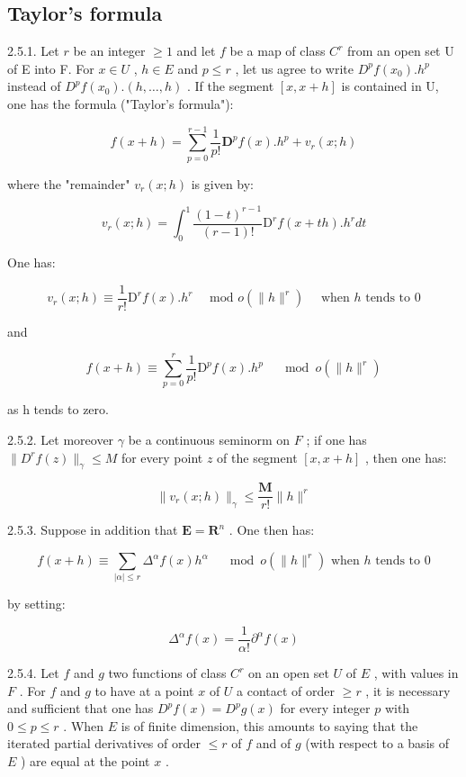 \subsection{Taylor's formula}

2.5.1. Let \(r\) be an integer \(\geqslant 1\) and let \(f\) be a map of class \(C^r\) from an open set U of E into F. For \(x \in U\) , \(h \in E\) and \(p \leqslant r\) , let us agree to write \(D^{p}f(x_0).h^p\) instead of \(D^{p}f(x_0).(h,\ldots,h)\) . If the segment \([x,x + h]\) is contained in U, one has the formula ("Taylor's formula"):

\[
f (x + h) = \sum_ {p = 0} ^ {r - 1} \frac {1}{p !} \mathbf {D} ^ {p} f (x). h ^ {p} + v _ {r} (x; h)
\]

where the "remainder" \(v_{r}(x; h)\) is given by:

\[
v _ {r} (x; h) = \int_ {0} ^ {1} \frac {(1 - t) ^ {r - 1}}{(r - 1) !} \mathrm{D} ^ {r} f (x + t h). h ^ {r} d t
\]

One has:

\[
v _ {r} (x; h) \equiv \frac {1}{r !} \mathrm{D} ^ {r} f (x). h ^ {r} \quad \text {   mod   } o (\| h \| ^ {r}) \quad \text {   when   } h \text {   tends   to   } 0
\]

and

\[
f (x + h) \equiv \sum_ {p = 0} ^ {r} \frac {1}{p !} \mathrm{D} ^ {p} f (x). h ^ {p} \quad \mod o (\| h \| ^ {r})
\]

as h tends to zero.

2.5.2. Let moreover \(\gamma\) be a continuous seminorm on \(F\) ; if one has \(\|D^{r}f(z)\|_{\gamma}\leqslant M\) for every point \(z\) of the segment \([x,x + h]\) , then one has:

\[
\| v _ {r} (x; h) \| _ {\gamma} \leqslant \frac {\mathbf {M}}{r !} \| h \| ^ {r}
\]

2.5.3. Suppose in addition that \(\mathbf{E} = \mathbf{R}^n\) . One then has:

\[
f (x + h) \equiv \sum_ {| \alpha | \leqslant r} \Delta^ {\alpha} f (x) h ^ {\alpha} \quad \mod o (\| h \| ^ {r}) \text {   when   } h \text {   tends   to   } 0
\]

by setting:

\[
\Delta^ {\alpha} f (x) = \frac {1}{\alpha !} \partial^ {\alpha} f (x)
\]

2.5.4. Let \(f\) and \(g\) two functions of class \(C^r\) on an open set \(U\) of \(E\) , with values in \(F\) . For \(f\) and \(g\) to have at a point \(x\) of \(U\) a contact of order \(\geqslant r\) , it is necessary and sufficient that one has \(D^p f(x) = D^p g(x)\) for every integer \(p\) with \(0 \leqslant p \leqslant r\) . When \(E\) is of finite dimension, this amounts to saying that the iterated partial derivatives of order \(\leqslant r\) of \(f\) and of \(g\) (with respect to a basis of \(E\) ) are equal at the point \(x\) .

